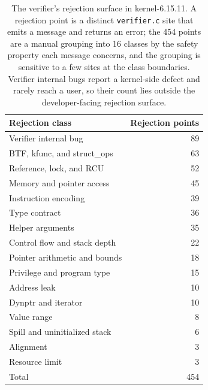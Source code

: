 \begin{table}[t]
  \centering
  \caption{The verifier's rejection surface in kernel-6.15.11. A rejection point
  is a distinct \texttt{verifier.c} site that emits a message and returns an
  error; the 454 points are a manual grouping into 16 classes by the safety
  property each message concerns, and the grouping is sensitive to a few sites
  at the class boundaries. Verifier internal bugs report a kernel-side defect
  and rarely reach a user, so their count lies outside the developer-facing
  rejection surface.}
  \label{tab:error-space}
  \small
  \begin{tabular}{@{}l r@{}}
    \toprule
    Rejection class & Rejection points \\
    \midrule
    Verifier internal bug          & 89 \\
    BTF, kfunc, and struct\_ops    & 63 \\
    Reference, lock, and RCU       & 52 \\
    Memory and pointer access      & 45 \\
    Instruction encoding           & 39 \\
    Type contract                  & 36 \\
    Helper arguments               & 35 \\
    Control flow and stack depth   & 22 \\
    Pointer arithmetic and bounds  & 18 \\
    Privilege and program type     & 15 \\
    Address leak                   & 10 \\
    Dynptr and iterator            & 10 \\
    Value range                    & 8  \\
    Spill and uninitialized stack  & 6  \\
    Alignment                      & 3  \\
    Resource limit                 & 3  \\
    \midrule
    Total                          & 454 \\
    \bottomrule
  \end{tabular}
\end{table}
